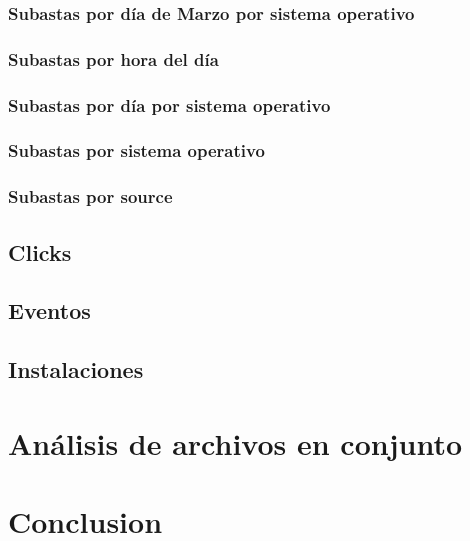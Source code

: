 \documentclass{article}
\begin{document}
	\subsubsection{Subastas por día de Marzo por sistema operativo}
	\subsubsection{Subastas por hora del día}
	\subsubsection{Subastas por día por sistema operativo}
	\subsubsection{Subastas por sistema operativo}
	\subsubsection{Subastas por source}
	

\subsection{Clicks}

\subsection{Eventos}

\subsection{Instalaciones}

\section{Análisis de archivos en conjunto}

\section{Conclusion}




\end{document}
